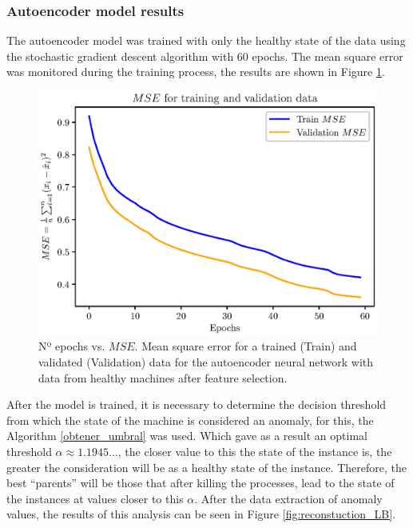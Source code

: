 \documentclass{iosart2c}
\begin{document}
\subsubsection{Autoencoder model results}\label{results_autoencoder}

The autoencoder model was trained with only the healthy state of the data using the stochastic gradient descent algorithm with 60 epochs. The mean square error was monitored during the training process, the results are shown in Figure \ref{fig:autoencoder_variable_selected}.\\



\begin{figure}[h!]
\centering
\includegraphics[scale=0.56]{figs/autoencoder/final_autoencoder.eps}
\caption{Nº epochs vs. $MSE$. Mean square error for a trained (Train) and validated (Validation) data for the autoencoder neural network with data from healthy machines after feature selection.}
\label{fig:autoencoder_variable_selected}
\end{figure}

After the model is trained, it is necessary to determine the decision threshold from which the state of the machine is considered an anomaly, for this, the Algorithm \ref{obtener_umbral} was used. Which gave as a result an optimal threshold $\alpha\approx 1.1945\ldots$, the closer value to this the state of the instance is, the greater the consideration will be as a healthy state of the instance. Therefore, the best ``parents'' will be those that after killing the processes, lead to the state of the instances at values closer to this $\alpha$. After the data extraction of anomaly values, the results of this analysis can be seen in Figure \ref{fig:reconstuction_LB}.\\
\end{document}
